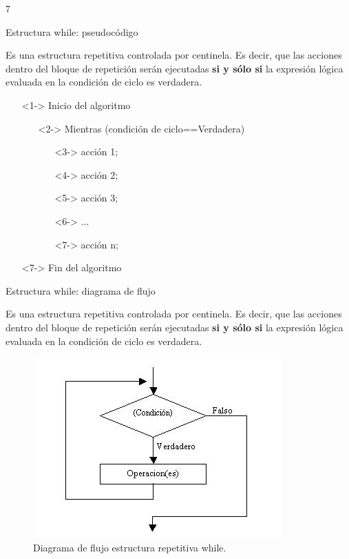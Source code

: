 7\documentclass[xcolor=pdftex,table,11pt]{beamer}
\begin{document}
\begin{frame}{Estructura while: pseudocódigo}

 \begin{block}{}
 Es una estructura repetitiva controlada por centinela. Es decir, que las acciones dentro del bloque de repetición serán ejecutadas \textbf{si y sólo si} la expresión lógica evaluada en la condición de ciclo es verdadera. 
\end{block}
\begin{itemize}
   \item[]<1-> Inicio del algoritmo

   \begin{itemize}
   		\item[]<2-> Mientras (condición de ciclo==Verdadera)
     	\begin{itemize}
     			\item[]<3->  acción 1;
     			\item[]<4->  acción 2;
     			\item[]<5->  acción 3;
     			\item[]<6->  ...
     			\item[]<7->  acción n;
     	\end{itemize}
   \end{itemize}
  \item[]<7-> Fin del algoritmo 
  
  
\end{itemize}



\end{frame}


\begin{frame}{Estructura while: diagrama de flujo}

 \begin{block}{}
 Es una estructura repetitiva controlada por centinela. Es decir, que las acciones dentro del bloque de repetición serán ejecutadas \textbf{si y sólo si} la expresión lógica evaluada en la condición de ciclo es verdadera. 
\end{block}
 \begin{figure}
 \centering
\includegraphics[scale=0.5]{../img/exported/while.jpg}
\caption{Diagrama de flujo estructura repetitiva while.}
\end{figure}
\end{frame}
\end{document}
